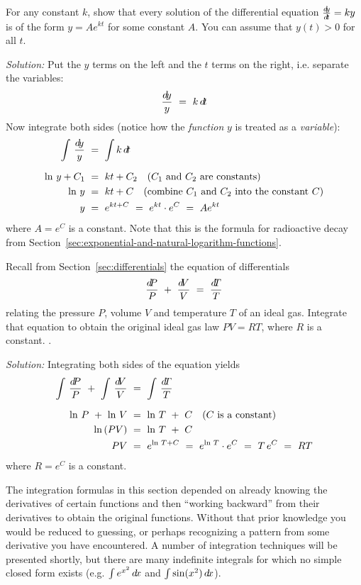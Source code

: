 \begin{exmp}\label{exmp:intdecay}
\noindent For any constant $k$, show that every solution of the differential
equation $\frac{d\negmedspace y}{d\!t} = ky$ is of the form $y = Ae^{kt}$ for some constant
$A$. You can assume that $y(t) > 0$ for all $t$.\vspace{1mm}
\par\noindent\emph{Solution:} Put the $y$ terms on the left and the $t$ terms on
the right, i.e. separate the variables:
\[
\frac{d\!y}{y} ~=~ k\,d\!t
\]
Now integrate both sides (notice how the \emph{function} $y$ is treated as a
\emph{variable}):
\begin{align*}
\int\,\frac{d\!y}{y} ~&=~ \int k\,d\!t\\[6pt]
\ln\,y  + C_1 ~&=~ kt + C_2 \quad\text{($C_1$ and $C_2$ are constants)}\\
\ln\,y  ~&=~ kt + C \quad\text{(combine $C_1$ and $C_2$ into the constant $C$)}\\
y ~&=~ e^{kt+C} ~=~ e^{kt} \cdot e^C ~=~ A e^{kt}
\end{align*}
where $A = e^C$ is a constant. Note that this is the formula for radioactive
decay from Section~\ref{sec:exponential-and-natural-logarithm-functions}.
\end{exmp}
\begin{exmp}\label{exmp:intidealgas}
\noindent Recall from Section~\ref{sec:differentials} the equation of differentials
\[
\dfrac{d\negmedspace P}{P} ~+~ \dfrac{d\negmedspace V}{V} ~=~ \dfrac{d\negmedspace T}{T}
\]
relating the pressure $P$, volume $V$ and temperature $T$ of an ideal gas.
Integrate that equation to obtain the original ideal gas law $PV = RT$, where
$R$ is a constant.
.\vspace{1mm}
\par\noindent\emph{Solution:} Integrating both sides of the equation yields
\begin{align*}
\int\,\dfrac{d\negmedspace P}{P} ~+~ \int\,\dfrac{d\negmedspace V}{V} ~&=~ \int\,\dfrac{d\negmedspace T}{T}\\[6pt]
\ln\,P ~+~ \ln\,V ~&=~ \ln\,T ~+~ C \quad\text{($C$ is a constant)}\\
\ln\,(PV) ~&=~ \ln\,T ~+~ C\\
PV ~&=~ e^{\ln\,T + C} ~=~ e^{\ln\,T} \cdot e^{C} ~=~ T\,e^C ~=~ RT
\end{align*}
where $R = e^C$ is a constant.\quad\checkmark
\end{exmp}\vspace{-1mm}
\divider
\vspace{2mm}

The integration formulas in this section depended on already knowing the
derivatives of certain functions and then ``working backward'' from their
derivatives to obtain the original functions. Without that prior knowledge you
would be reduced to guessing, or perhaps recognizing a pattern from some
derivative you have encountered. A number of integration techniques will be
presented shortly, but there are many indefinite integrals for which no simple
closed form exists (e.g. $\int e^{x^2}\,d\!x$ and
$\int \sin(x^2)\,d\!x$).\vspace{2mm}

